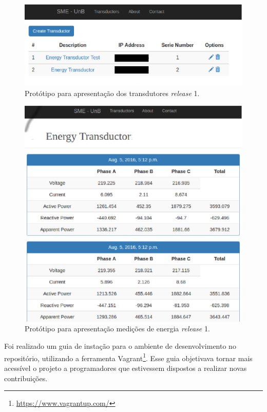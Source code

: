 \begin{figure}[!htb]
    \centering
    \includegraphics[keepaspectratio=true,scale=0.5]{figuras/coleta_dados_02.eps}
    \caption{Protótipo para apresentação dos transdutores \textit{release} 1.}
    \label{dados02}
\end{figure}

\begin{figure}[!htb]
    \centering
    \includegraphics[keepaspectratio=true,scale=0.5]{figuras/coleta_dados_01.eps}
    \caption{Protótipo para apresentação medições de energia \textit{release} 1.}
    \label{dados01}
\end{figure}

Foi realizado um guia de instação para o ambiente de desenvolvimento no repositório, utilizando a ferramenta Vagrant\footnote{\url{https://www.vagrantup.com/}}. Esse guia objetivava tornar mais acessível o projeto a programadores que estivessem dispostos a realizar novas contribuições.

